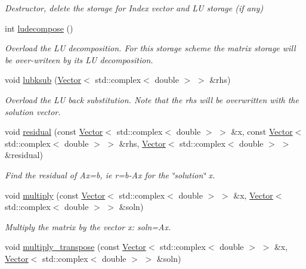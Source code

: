 \begin{DoxyCompactItemize}
\begin{DoxyCompactList}\small\item\em Destructor, delete the storage for Index vector and LU storage (if any) \end{DoxyCompactList}\item 
int \hyperlink{classoomph_1_1DenseComplexMatrix_a8503c0e46409613c58261ce6136f88b9}{ludecompose} ()
\begin{DoxyCompactList}\small\item\em Overload the LU decomposition. For this storage scheme the matrix storage will be over-\/writeen by its LU decomposition. \end{DoxyCompactList}\item 
void \hyperlink{classoomph_1_1DenseComplexMatrix_abcd909e71bdcae1059eb8779de72a99d}{lubksub} (\hyperlink{classoomph_1_1Vector}{Vector}$<$ std\+::complex$<$ double $>$ $>$ \&rhs)
\begin{DoxyCompactList}\small\item\em Overload the LU back substitution. Note that the rhs will be overwritten with the solution vector. \end{DoxyCompactList}\item 
void \hyperlink{classoomph_1_1DenseComplexMatrix_a76146afe81a055af475a107231468afb}{residual} (const \hyperlink{classoomph_1_1Vector}{Vector}$<$ std\+::complex$<$ double $>$ $>$ \&x, const \hyperlink{classoomph_1_1Vector}{Vector}$<$ std\+::complex$<$ double $>$ $>$ \&rhs, \hyperlink{classoomph_1_1Vector}{Vector}$<$ std\+::complex$<$ double $>$ $>$ \&residual)
\begin{DoxyCompactList}\small\item\em Find the residual of Ax=b, ie r=b-\/\+Ax for the \char`\"{}solution\char`\"{} x. \end{DoxyCompactList}\item 
void \hyperlink{classoomph_1_1DenseComplexMatrix_afcc47dd450a1ab37d2790b5d0279cadf}{multiply} (const \hyperlink{classoomph_1_1Vector}{Vector}$<$ std\+::complex$<$ double $>$ $>$ \&x, \hyperlink{classoomph_1_1Vector}{Vector}$<$ std\+::complex$<$ double $>$ $>$ \&soln)
\begin{DoxyCompactList}\small\item\em Multiply the matrix by the vector x\+: soln=Ax. \end{DoxyCompactList}\item 
void \hyperlink{classoomph_1_1DenseComplexMatrix_aaaf8f0589e011bf720791058711fa952}{multiply\+\_\+transpose} (const \hyperlink{classoomph_1_1Vector}{Vector}$<$ std\+::complex$<$ double $>$ $>$ \&x, \hyperlink{classoomph_1_1Vector}{Vector}$<$ std\+::complex$<$ double $>$ $>$ \&soln)

\end{DoxyCompactItemize}
